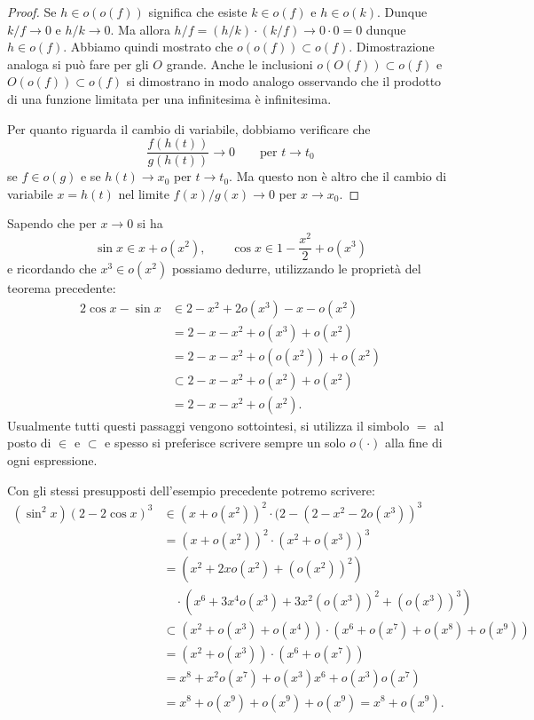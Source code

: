 \begin{proof}
Se $h\in o(o(f))$ significa che esiste $k\in o(f)$ e $h\in o(k)$. Dunque $k/f\to 0 $ e $h/k\to 0$. Ma allora $h/f = (h/k)\cdot (k/f) \to 0\cdot 0 = 0$ dunque $h \in o(f)$. Abbiamo quindi mostrato che $o(o(f)) \subset o(f)$. Dimostrazione analoga si può fare per gli $O$ grande. Anche le inclusioni $o(O(f))\subset o(f)$ e $O(o(f))\subset o(f)$ si dimostrano in modo analogo osservando che il prodotto di una funzione limitata per una infinitesima è infinitesima.

Per quanto riguarda il cambio di variabile, dobbiamo verificare che
\[
  \frac{f(h(t))}{g(h(t))} \to 0
  \qquad\text{per $t\to t_0$}
\]
se $f\in o(g)$ e se $h(t)\to x_0$ per $t \to t_0$. Ma questo non è altro che il cambio di variabile $x=h(t)$ nel limite $f(x)/g(x)\to 0$ per $x\to x_0$.
\end{proof}

\begin{example}
Sapendo che per $x\to 0$ si ha
\[
\sin x \in x + o(x^2), \qquad \cos x \in 1 - \frac {x^2}{2} + o(x^3)
\]
e ricordando che $x^3 \in o (x^2)$ possiamo dedurre, utilizzando le proprietà del teorema precedente:
\begin{align*}
2\cos x  - \sin x
&\in 2 - x^2 + 2o(x^3) - x - o(x^2)\\
&= 2- x - x^2 + o(x^3) + o(x^2)\\
&= 2- x - x^2 + o(o(x^2)) + o(x^2)\\
 &\subset 2 - x - x^2 + o(x^2) + o(x^2)\\
 &= 2-x-x^2 + o(x^2).
\end{align*}
Usualmente tutti questi passaggi vengono sottointesi, si utilizza il simbolo $=$ al posto di $\in$ e $\subset$ e spesso si preferisce scrivere sempre un solo $o(\cdot)$ alla fine di ogni espressione.
\end{example}

\begin{example}
Con gli stessi presupposti dell'esempio precedente potremo
scrivere:
\begin{align*}
(\sin^2 x)(2-2\cos x)^3
&\in (x+o(x^2))^2 \cdot (2 - (2- x^2 - 2o(x^3))^3 \\
&= (x+o(x^2))^2 \cdot (x^2+o(x^3))^3 \\
&= (x^2 + 2 x o(x^2) + (o(x^2))^2) \\
&\quad \cdot (x^6 + 3 x^4 o(x^3) + 3 x^2(o(x^3))^2 + (o(x^3))^3)\\
&\subset (x^2 + o(x^3) + o(x^4))\cdot(x^6 + o(x^7) + o(x^8) + o(x^9)) \\
&= (x^2 + o(x^3)) \cdot(x^6+o(x^7)) \\
&= x^8 + x^2o(x^7) + o(x^3) x^6 + o(x^3)o(x^7)\\
&= x^8 + o(x^9) + o(x^9) + o(x^9)
= x^8 + o(x^9).
\end{align*}
\end{example}

